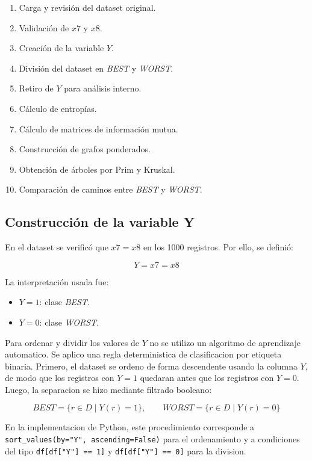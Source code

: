 \documentclass[12pt,a4paper]{article}
\newcommand{\formula}[1]{
\begin{cajaformula}
\centering
#1
\end{cajaformula}
}
\begin{document}
\begin{enumerate}
    \item Carga y revisión del dataset original.
    \item Validación de \(x7\) y \(x8\).
    \item Creación de la variable \(Y\).
    \item División del dataset en \textit{BEST} y \textit{WORST}.
    \item Retiro de \(Y\) para análisis interno.
    \item Cálculo de entropías.
    \item Cálculo de matrices de información mutua.
    \item Construcción de grafos ponderados.
    \item Obtención de árboles por Prim y Kruskal.
    \item Comparación de caminos entre \textit{BEST} y \textit{WORST}.
\end{enumerate}

\subsection{Construcción de la variable Y}

En el dataset se verificó que \(x7=x8\) en los 1000 registros. Por ello, se definió:

\formula{
\[
Y=x7=x8
\]
}

La interpretación usada fue:

\begin{itemize}
    \item \(Y=1\): clase \textit{BEST}.
    \item \(Y=0\): clase \textit{WORST}.
\end{itemize}

Para ordenar y dividir los valores de \(Y\) no se utilizo un algoritmo de aprendizaje automatico. Se aplico una regla deterministica de clasificacion por etiqueta binaria. Primero, el dataset se ordeno de forma descendente usando la columna \(Y\), de modo que los registros con \(Y=1\) quedaran antes que los registros con \(Y=0\). Luego, la separacion se hizo mediante filtrado booleano:

\formula{
\[
BEST=\{r \in D \mid Y(r)=1\}, \qquad WORST=\{r \in D \mid Y(r)=0\}
\]
}

En la implementacion de Python, este procedimiento corresponde a \texttt{sort\_values(by="Y", ascending=False)} para el ordenamiento y a condiciones del tipo \texttt{df[df["Y"] == 1]} y \texttt{df[df["Y"] == 0]} para la division.
\end{document}
